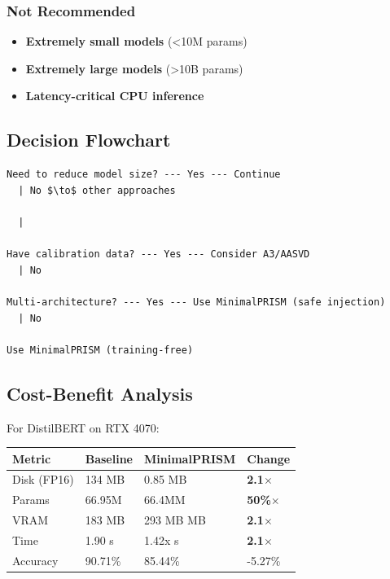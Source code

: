 \subsubsection{Not Recommended}

\begin{itemize}
\item \textbf{Extremely small models} (\textless{}10M params)
\item \textbf{Extremely large models} (\textgreater{}10B params)
\item \textbf{Latency-critical CPU inference}

\end{itemize}
\subsection{Decision Flowchart}

\begin{lstlisting}
Need to reduce model size? --- Yes --- Continue
  | No $\to$ other approaches

  |
   
Have calibration data? --- Yes --- Consider A3/AASVD
  | No
   
Multi-architecture? --- Yes --- Use MinimalPRISM (safe injection)
  | No
   
Use MinimalPRISM (training-free)
\end{lstlisting}

\subsection{Cost-Benefit Analysis}

For DistilBERT on RTX 4070:

\begin{table}[H]
\centering
\small
\begin{tabular}{llll}
\toprule
\textbf{Metric} & \textbf{Baseline} & \textbf{MinimalPRISM} & \textbf{Change} \\
\midrule
Disk (FP16) & 134 MB & 0.85 MB & \textbf{2.1$\times$} \\
Params & 66.95M & 66.4MM & \textbf{50\%$\times$} \\
VRAM & 183 MB & 293 MB MB & \textbf{2.1$\times$} \\
Time & 1.90 s & 1.42x s & \textbf{2.1$\times$} \\
Accuracy & 90.71\% & 85.44\% & -5.27\% \\
\bottomrule
\end{tabular}
\end{table}

